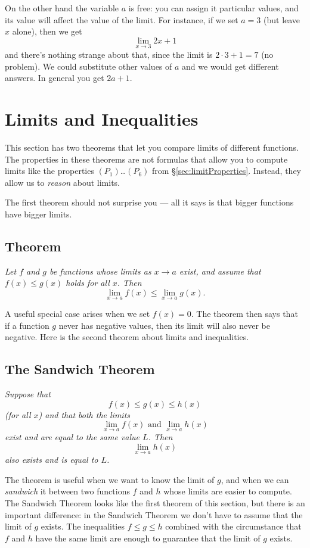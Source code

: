 On the other hand the variable $a$ is free: you can assign it particular
values, and its value will affect the value of the limit.  For instance, if
we set $a=3$ (but leave $x$ alone), then we get
\[
\lim_{x\to 3} 2x+1
\]
and there's nothing strange about that, since the limit is $2\cdot3+1=7$ (no
problem).  We could substitute other values of $a$ and we would get
different answers. In general you get $2a+1$.

\section{Limits and Inequalities} 
\label{sec:limits-and-inequalities}%
This section has two theorems that let you compare limits of different
functions.  The properties in these theorems are not formulas that
allow you to compute limits like the properties $(P_1)$\ldots$(P_6)$
from \S\ref{sec:limitProperties}.  Instead, they allow us to
\emph{reason} about limits.

The first theorem should not surprise you --- all it says is that bigger
functions have bigger limits.

\subsection{Theorem} 
\itshape
Let $f$ and $g$ be functions whose limits as $x\to a$ exist, and assume
that $f(x)\leq g(x)$ holds for all $x$.  Then
\[
\lim_{x\to a}f(x) \leq \lim_{x\to a} g(x).
\]
\upshape

A useful special case arises when we set $f(x)=0$.  The theorem then says
that if a function $g$ never has negative values, then its limit will also
never be negative.
Here is the second theorem about limits and inequalities.

\subsection{The Sandwich Theorem} 
\itshape
Suppose that
\[
f(x)\le g(x)\le h(x)
\]
(for all $x$) and that both the limits
\[
  \lim_{x\to a} f(x) \text{ and } \lim_{x\to a} h(x)
\]
exist and are equal to the same value $L$. Then
\[
\lim_{x\to a} h(x)
\]
also exists and is equal to $L$.
\upshape

The theorem is useful when we want to know the limit of $g$, and when we
can \emph{sandwich} it between two functions $f$ and $h$ whose limits are
easier to compute.  The Sandwich Theorem looks like the first theorem of
this section, but there is an important difference: in the Sandwich Theorem
we don't have to assume that the limit of $g$ exists.  The inequalities
$f\leq g\leq h$ combined with the circumstance that $f$ and $h$ have the
same limit are enough to guarantee that the limit of $g$ exists.

